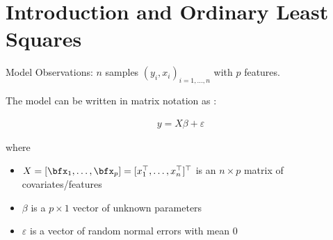 \documentclass[unknownkeysallowed]{beamer}
\begin{document}




\section{Introduction and Ordinary Least Squares}
\label{sec:introdcution}


\begin{frame}{Model}
Observations: $n$ samples $(y_i, x_i)_{i=1,\dots,n}$ with $p$ features.

The model can be written in matrix notation as :

\begin{align*}
	\boxed{y=X\beta+\varepsilon}
\end{align*}

where
\begin{itemize}
	\item $X=[\bfx_1,\dots,\bfx_p]= [x_1^\top,\dots,x_n^\top]^\top$ is an $n \times p$ matrix of covariates/features
	\item $\beta$ is a $p \times 1$ vector of unknown parameters
	\item $\varepsilon$ is a vector of \iid random normal errors with mean $0$
\end{itemize}

\end{frame}
\end{document}
